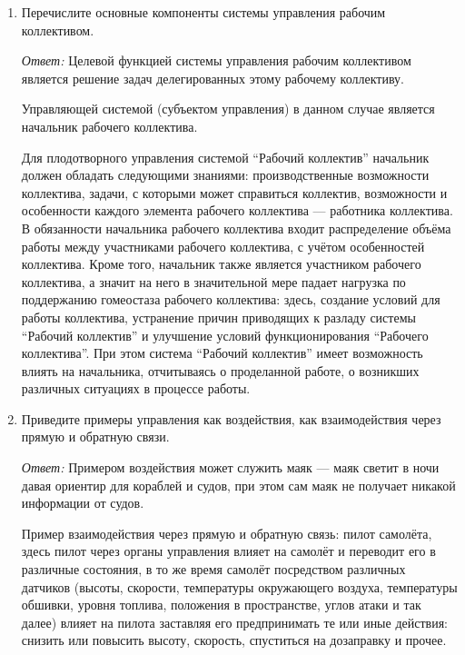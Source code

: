 \documentclass[10pt]{article}
\begin{document}
\begin{enumerate}
  \item{Перечислите основные компоненты системы управления рабочим коллективом.}

    \emph{Ответ:} Целевой функцией системы управления рабочим коллективом является решение задач делегированных этому рабочему коллективу.

    Управляющей системой (субъектом управления) в данном случае является начальник рабочего коллектива.

    Для плодотворного управления системой ``Рабочий коллектив'' начальник должен обладать следующими знаниями: производственные возможности коллектива, задачи, с которыми может справиться коллектив, возможности и особенности каждого элемента рабочего коллектива --- работника коллектива. В обязанности начальника рабочего коллектива входит распределение объёма работы между участниками рабочего коллектива, с учётом особенностей коллектива. Кроме того, начальник также является участником рабочего коллектива, а значит на него в значительной мере падает нагрузка по поддержанию гомеостаза рабочего коллектива: здесь, создание условий для работы коллектива, устранение причин приводящих к разладу системы ``Рабочий коллектив'' и улучшение условий функционирования ``Рабочего коллектива''. При этом система ``Рабочий коллектив'' имеет возможность влиять на начальника, отчитываясь о проделанной работе, о возникших различных ситуациях в процессе работы.

  \item{Приведите примеры управления как воздействия, как взаимодействия через прямую и обратную связи.}

    \emph{Ответ:} Примером воздействия может служить маяк --- маяк светит в ночи давая ориентир для кораблей и судов, при этом сам маяк не получает никакой информации от судов.

    Пример взаимодействия через прямую и обратную связь: пилот самолёта, здесь пилот через органы управления влияет на самолёт и переводит его в различные состояния, в то же время самолёт посредством различных датчиков (высоты, скорости, температуры окружающего воздуха, температуры обшивки, уровня топлива, положения в пространстве, углов атаки и так далее) влияет на пилота заставляя его предпринимать те или иные действия: снизить или повысить высоту, скорость, спуститься на дозаправку и прочее.    
\end{enumerate}
\end{document}
